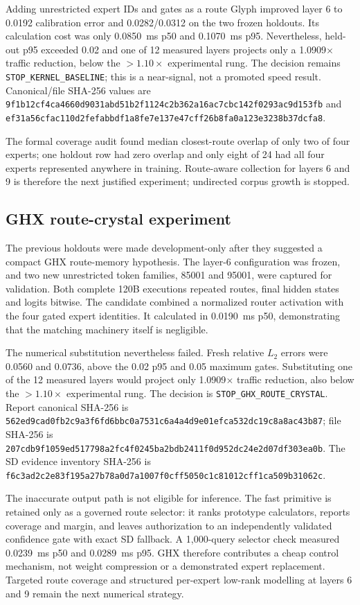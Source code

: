 Adding unrestricted expert IDs and gates as a route Glyph improved layer 6 to
0.0192 calibration error and 0.0282/0.0312 on the two frozen holdouts.  Its
calculation cost was only 0.0850~ms p50 and 0.1070~ms p95.  Nevertheless,
held-out p95 exceeded 0.02 and one of 12 measured layers projects only a
1.0909$\times$ traffic reduction, below the $>1.10\times$ experimental rung.
The decision remains \texttt{STOP\_KERNEL\_BASELINE}; this is a near-signal,
not a promoted speed result.  Canonical/file SHA-256 values are
\texttt{9f1b12cf4ca4660d9031abd51b2f1124c2b362a16ac7cbc142f0293ac9d153fb}
and
\texttt{ef31a56cfac110d2fefabbdf1a8fe7e137e47cff26b8fa0a123e3238b37dcfa8}.

The formal coverage audit found median closest-route overlap of only two of
four experts; one holdout row had zero overlap and only eight of 24 had all
four experts represented anywhere in training.  Route-aware collection for
layers 6 and 9 is therefore the next justified experiment; undirected corpus
growth is stopped.

\subsection{GHX route-crystal experiment}

The previous holdouts were made development-only after they suggested a compact
GHX route-memory hypothesis.  The layer-6 configuration was frozen, and two
new unrestricted token families, 85001 and 95001, were captured for validation.
Both complete 120B executions repeated routes, final hidden states and logits
bitwise.  The candidate combined a normalized router activation with the four
gated expert identities.  It calculated in 0.0190~ms p50, demonstrating that
the matching machinery itself is negligible.

The numerical substitution nevertheless failed.  Fresh relative $L_2$ errors
were 0.0560 and 0.0736, above the 0.02 p95 and 0.05 maximum gates.  Substituting
one of the 12 measured layers would project only 1.0909$\times$ traffic
reduction, also below the $>1.10\times$ experimental rung.  The decision is
\texttt{STOP\_GHX\_ROUTE\_CRYSTAL}.  Report canonical SHA-256 is
\texttt{562ed9cad0fb2c9a3f6fd6bbc0a7531c6a4a4d9e01efca532dc19c8a8ac43b87};
file SHA-256 is
\texttt{207cdb9f1059ed517798a2fc4f0245ba2bdb2411f0d952dc24e2d07df303ea0b}.
The SD evidence inventory SHA-256 is
\texttt{f6c3ad2c2e83f195a27b78a0d7a1007f0cff5050c1c81012cff1ca509b31062c}.

The inaccurate output path is not eligible for inference.  The fast primitive
is retained only as a governed route selector: it ranks prototype calculators,
reports coverage and margin, and leaves authorization to an independently
validated confidence gate with exact SD fallback.  A 1,000-query selector
check measured 0.0239~ms p50 and 0.0289~ms p95.  GHX therefore contributes a
cheap control mechanism, not weight compression or a demonstrated expert
replacement.  Targeted route coverage and structured per-expert low-rank
modelling at layers 6 and 9 remain the next numerical strategy.

